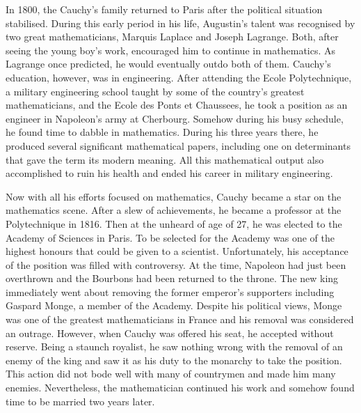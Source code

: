 In 1800, the Cauchy's family returned to Paris after the political situation
stabilised. During this early period in his life, Augustin's talent was
recognised by two great mathematicians, Marquis Laplace and Joseph Lagrange.
Both, after seeing the young boy's work, encouraged him to continue in
mathematics. As Lagrange once predicted, he would eventually outdo both of them.
Cauchy's education, however, was in engineering. After attending the Ecole
Polytechnique, a military engineering school taught by some of the country's
greatest mathematicians, and the Ecole des Ponts et Chaussees, he took a
position as an engineer in Napoleon's army at Cherbourg. Somehow during his busy
schedule, he found time to dabble in mathematics. During his three years there,
he produced several significant mathematical papers, including one on
determinants that gave the term its modern meaning. All this mathematical output
also accomplished to ruin his health and ended his career in military
engineering.


Now with all his efforts focused on mathematics, Cauchy became a star on the
mathematics scene. After a slew of achievements, he became a professor at the
Polytechnique in 1816. Then at the unheard of age of 27, he was elected to the
Academy of Sciences in Paris. To be selected for the Academy was one of the
highest honours that could be given to a scientist. Unfortunately, his
acceptance of the position was filled with controversy. At the time, Napoleon
had just been overthrown and the Bourbons had been returned to the throne. The
new king immediately went about removing the former emperor's supporters
including Gaspard Monge, a member of the Academy. Despite his political views,
Monge was one of the greatest mathematicians in France and his removal was
considered an outrage. However, when Cauchy was offered his seat, he accepted
without reserve. Being a staunch royalist, he saw nothing wrong with the removal
of an enemy of the king and saw it as his duty to the monarchy to take the
position. This action did not bode well with many of countrymen and made him
many enemies. Nevertheless, the mathematician continued his work and somehow
found time to be married two years later.


